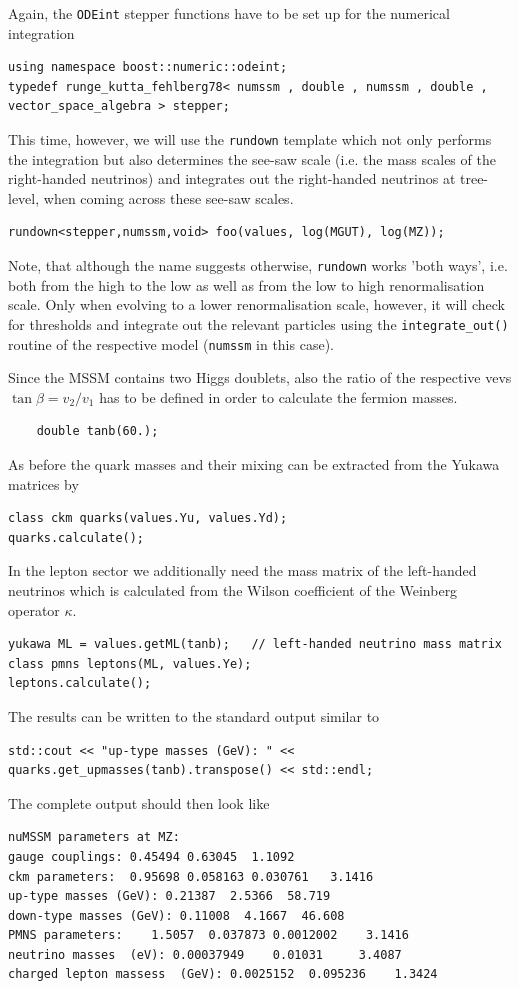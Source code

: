 \documentclass[11pt,a4paper]{article}
\begin{document}
 Again, the \texttt{ODEint} stepper functions have to be set up for the numerical integration
\begin{lstlisting}
using namespace boost::numeric::odeint;
typedef runge_kutta_fehlberg78< numssm , double , numssm , double , vector_space_algebra > stepper;
 \end{lstlisting}
 This time, however, we will use the \texttt{rundown} template which not only performs the integration but also determines the see-saw scale (i.e. the mass scales of the right-handed neutrinos) and integrates out the right-handed neutrinos at tree-level, when coming across these see-saw scales.
  \begin{lstlisting}
rundown<stepper,numssm,void> foo(values, log(MGUT), log(MZ));
  \end{lstlisting}
  Note, that although the name suggests otherwise, \texttt{rundown} works 'both ways', i.e. both from the high to the low as well as from the low to high renormalisation scale. Only when evolving to a lower renormalisation scale, however, it will check for thresholds and integrate out the relevant particles using the \texttt{integrate\_out()} routine of the respective model (\texttt{numssm} in this case).
  
  Since the MSSM contains two Higgs doublets, also the ratio of the respective vevs $\tan\beta = v_2 / v_1$ has to be defined in order to calculate the fermion masses.
    \begin{lstlisting}
    double tanb(60.);
    \end{lstlisting}
As before the quark masses and their mixing can be extracted from the Yukawa matrices by
  \begin{lstlisting}
class ckm quarks(values.Yu, values.Yd);
quarks.calculate();
    \end{lstlisting}
    In the lepton sector we additionally need the mass matrix of the left-handed neutrinos which is calculated from the Wilson coefficient of the Weinberg operator $\kappa$.
    \begin{lstlisting}
yukawa ML = values.getML(tanb);   // left-handed neutrino mass matrix
class pmns leptons(ML, values.Ye);
leptons.calculate();
  \end{lstlisting}
  The results can be written to the standard output similar to
  \begin{lstlisting}
std::cout << "up-type masses (GeV): " << quarks.get_upmasses(tanb).transpose() << std::endl;
\end{lstlisting}    
The complete output should then look like
\begin{lstlisting}
nuMSSM parameters at MZ:
gauge couplings: 0.45494 0.63045  1.1092
ckm parameters:  0.95698 0.058163 0.030761   3.1416
up-type masses (GeV): 0.21387  2.5366  58.719
down-type masses (GeV): 0.11008  4.1667  46.608
PMNS parameters:    1.5057  0.037873 0.0012002    3.1416
neutrino masses  (eV): 0.00037949    0.01031     3.4087
charged lepton massess  (GeV): 0.0025152  0.095236    1.3424
\end{lstlisting}    
\end{document}
